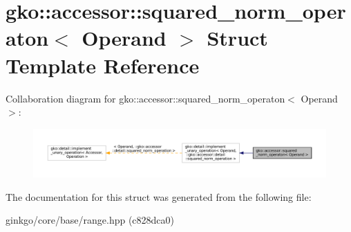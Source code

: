 \hypertarget{structgko_1_1accessor_1_1squared__norm__operaton}{}\section{gko\+:\+:accessor\+:\+:squared\+\_\+norm\+\_\+operaton$<$ Operand $>$ Struct Template Reference}
\label{structgko_1_1accessor_1_1squared__norm__operaton}


Collaboration diagram for gko\+:\+:accessor\+:\+:squared\+\_\+norm\+\_\+operaton$<$ Operand $>$\+:
\nopagebreak
\begin{figure}[H]
\begin{center}
\leavevmode
\includegraphics[width=350pt]{structgko_1_1accessor_1_1squared__norm__operaton__coll__graph}
\end{center}
\end{figure}


The documentation for this struct was generated from the following file\+:\begin{DoxyCompactItemize}
\item 
ginkgo/core/base/range.\+hpp (c828dca0)\end{DoxyCompactItemize}
